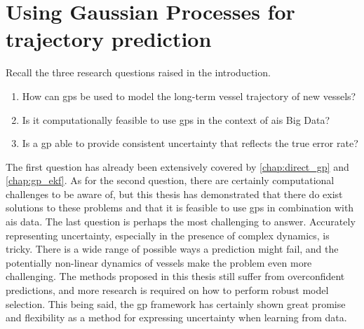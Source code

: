 \section{Using Gaussian Processes for trajectory prediction}
Recall the three research questions raised in the introduction.
\begin{enumerate}
	\item How can \acrshort{gp}s be used to model the long-term vessel trajectory of new vessels?   
	\item Is it computationally feasible to use \acrshort{gp}s in the context of \acrshort{ais} Big Data?
	\item Is a \acrshort{gp} able to provide consistent uncertainty that reflects the true error rate?
\end{enumerate}
The first question has already been extensively covered by \cref{chap:direct_gp} and \cref{chap:gp_ekf}. As for the second question, there are certainly computational challenges to be aware of, but this thesis has demonstrated that there do exist solutions to these problems and that it is feasible to use \acrshort{gp}s in combination with \acrshort{ais} data. The last question is perhaps the most challenging to answer. Accurately representing uncertainty, especially in the presence of complex dynamics, is tricky. There is a wide range of possible ways a prediction might fail, and the potentially non-linear dynamics of vessels make the problem even more challenging. The methods proposed in this thesis still suffer from overconfident predictions, and more research is required on how to perform robust model selection. This being said, the \acrshort{gp} framework has certainly shown great promise and flexibility as a method for expressing uncertainty when learning from data.

